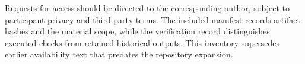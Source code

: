 Requests for access should be directed to the corresponding author, subject to participant privacy and third-party terms. The included manifest records artifact hashes and the material scope, while the verification record distinguishes executed checks from retained historical outputs. This inventory supersedes earlier availability text that predates the repository expansion.
